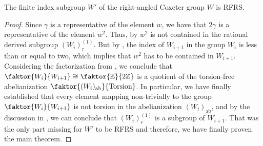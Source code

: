 \begin{corollary}
    The finite index subgroup \(W'\) of the right-angled Coxeter group \(W\) is RFRS.
\end{corollary}
\begin{proof}
    Since \(\gamma\) is a representative of the element \(w\), we have that \(2\gamma\) is a representative of the element \(w^2\).
    Thus, by  \(w^2\) is not contained in the rational derived subgroup \((W_i)_r^{(1)}\).
    But by , the index of \(W_{i+1}\) in the group \(W_i\) is less than or equal to two, which implies that \(w^2\) has to be contained in \(W_{i+1}\).
    Considering the factorization from , we conclude that \(\faktor{W_i}{W_{i+1}} \cong \faktor{\Z}{2\Z}\) is a quotient of the torsion-free abelianization \(\faktor{(W_i)_{\text{ab}}}{\text{Torsion}}\).
    In particular, we have finally established that every element mapping non-trivially to the group \(\faktor{W_i}{W_{i+1}}\) is not torsion in the abelianization \((W_i)_{\text{ab}}\), and by the discussion in , we can conclude that \((W_i)_r^{(1)}\) is a subgroup of \(W_{i+1}\).
    That was the only part missing for \(W'\) to be RFRS and therefore, we have finally proven the main theorem.
\end{proof}



